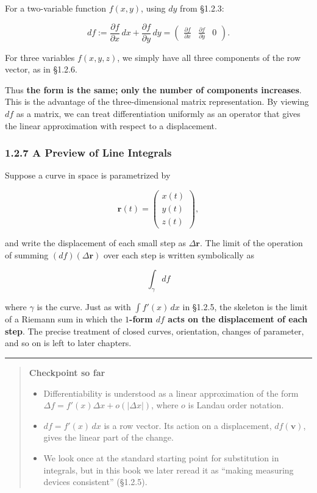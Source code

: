 For a two-variable function \(f(x,y)\), using \(dy\) from §1.2.3:

\[
df:=\frac{\partial f}{\partial x}\,dx+
\frac{\partial f}{\partial y}\,dy
=
\begin{pmatrix}
\frac{\partial f}{\partial x}&
\frac{\partial f}{\partial y}&0
\end{pmatrix}.
\]

For three variables \(f(x,y,z)\), we simply have all three components of
the row vector, as in §1.2.6.

Thus
\textbf{the form is the same; only the number of components increases}.
This is the advantage of the three-dimensional matrix representation. By
viewing \(df\) as a matrix, we can treat differentiation uniformly as an
operator that gives the linear approximation with respect to a
displacement.

\hypertarget{a-preview-of-line-integrals}{%
\subsubsection{1.2.7 A Preview of Line
Integrals}\label{a-preview-of-line-integrals}}

Suppose a curve in space is parametrized by

\[
\mathbf{r}(t)=\begin{pmatrix}x(t)\\y(t)\\z(t)\end{pmatrix},
\]

and write the displacement of each small step as \(\Delta\mathbf{r}\).
The limit of the operation of summing \((df)(\Delta\mathbf{r})\) over
each step is written symbolically as

\[
\int_\gamma df
\]

where \(\gamma\) is the curve. Just as with \(\int f'(x)\,dx\) in
§1.2.5, the skeleton is the limit of a Riemann sum in which the
\textbf{$1$-form $df$ acts on the displacement of each step}. The
precise treatment of closed curves, orientation, changes of parameter,
and so on is left to later chapters.

\begin{center}\rule{0.5\linewidth}{0.5pt}\end{center}

\begin{quote}
\textbf{Checkpoint so far}

\begin{itemize}
\item
  Differentiability is understood as a linear approximation of the form
  \(\Delta f=f'(x)\Delta x+o(|\Delta x|)\), where \(o\) is Landau order
  notation.
\item
  \(df=f'(x)\,dx\) is a row vector. Its action on a displacement,
  \(df(\mathbf{v})\), gives the linear part of the change.
\item
  We look once at the standard starting point for substitution in
  integrals, but in this book we later reread it as ``making measuring
  devices consistent'' (§1.2.5).
\end{itemize}
\end{quote}

